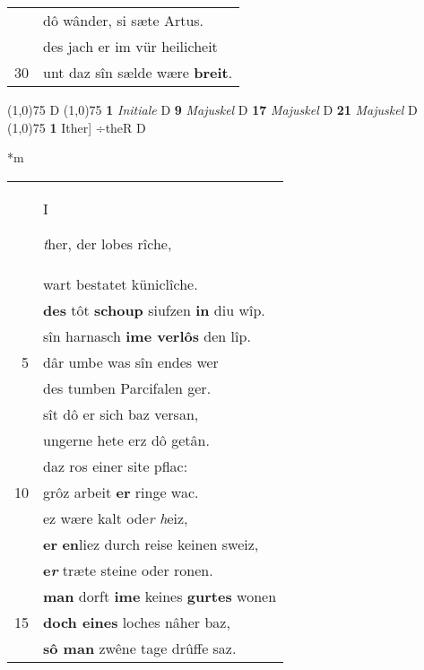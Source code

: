 \documentclass[8pt,a4paper,notitlepage]{article}
\begin{document}
\begin{table}[ht]
\begin{minipage}[t]{0.5\linewidth}
\begin{tabular}{rl}
 & dô wânder, si sæte Artus.\\ 
 & des jach er im vür heilicheit\\ 
30 & unt daz sîn sælde wære \textbf{breit}.\\ 
\end{tabular}
\scriptsize
\line(1,0){75} \newline
D \newline
\line(1,0){75} \newline
\textbf{1} \textit{Initiale} D  \textbf{9} \textit{Majuskel} D  \textbf{17} \textit{Majuskel} D  \textbf{21} \textit{Majuskel} D  \newline
\line(1,0){75} \newline
\textbf{1} Ither] ÷theR D \newline
\end{minipage}
\hspace{0.5cm}
\begin{minipage}[t]{0.5\linewidth}
\small
\begin{center}*m
\end{center}
\begin{tabular}{rl}
 & \begin{large}I\end{large}\textit{t}her, der lobes rîche,\\ 
 & wart bestatet küniclîche.\\ 
 & \textbf{des} tôt \textbf{schoup} siufzen \textbf{in} diu wîp.\\ 
 & sîn harnasch \textbf{ime verlôs} den lîp.\\ 
5 & dâr umbe was sîn endes wer\\ 
 & des tumben Parcifalen ger.\\ 
 & sît dô er sich baz versan,\\ 
 & ungerne hete erz dô getân.\\ 
 & daz ros einer site pflac:\\ 
10 & grôz arbeit \textbf{er} ringe wac.\\ 
 & ez wære kalt ode\textit{r h}eiz,\\ 
 & \textbf{er} \textbf{en}liez durch reise keinen sweiz,\\ 
 & \textbf{e\textit{r}} træte steine oder ronen.\\ 
 & \textbf{man} dorft \textbf{ime} keines \textbf{gurtes} wonen\\ 
15 & \textbf{doch eines} loches nâher baz,\\ 
 & \textbf{sô man} zwêne tage drûffe saz.\\ 

\end{tabular}
\end{minipage}
\end{table}
\end{document}
